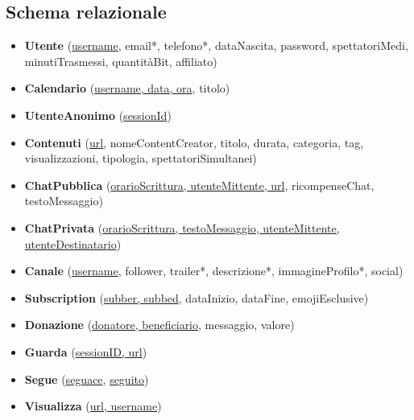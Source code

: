 \subsection{Schema relazionale}
\begin{itemize}
    \item \textbf{Utente} (\underline{username}, email*, telefono*, dataNascita, password, spettatoriMedi, minutiTrasmessi, quantitàBit, affiliato)
    \item \textbf{Calendario} (\underline{username, data, ora}, titolo)
    \item \textbf{UtenteAnonimo} (\underline{sessionId})
    \item \textbf{Contenuti} (\underline{url}, nomeContentCreator, titolo, durata, categoria, tag, visualizzazioni, tipologia, spettatoriSimultanei)
    \item \textbf{ChatPubblica} (\underline{orarioScrittura, utenteMittente, url}, ricompenseChat, testoMessaggio)
    \item \textbf{ChatPrivata} (\underline{orarioScrittura, testoMessaggio, utenteMittente, utenteDestinatario})
    \item \textbf{Canale} (\underline{username}, follower, trailer*, descrizione*, immagineProfilo*, social)
    \item \textbf{Subscription} (\underline{subber, subbed}, dataInizio, dataFine, emojiEsclusive)
    \item \textbf{Donazione} (\underline{donatore, beneficiario}, messaggio, valore)
    \item \textbf{Guarda} (\underline{sessionID, url})
    \item \textbf{Segue} (\underline{seguace}, \underline{seguito})
    \item \textbf{Visualizza} (\underline{url, username})
\end{itemize}

